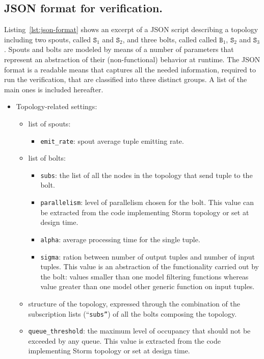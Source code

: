 {\color{blue}
\subsection{JSON format for verification.}
Listing~\ref{lst:json-format} shows an excerpt of a JSON script describing a topology including two spouts, called $\mathtt{S}_1$ and $\mathtt{S}_2$, and three bolts, called called $\mathtt{B}_1$, $\mathtt{S}_2$ and $\mathtt{S}_3$.
Spouts and bolts are modeled by means of a number of parameters that represent an abstraction of their (non-functional) behavior at runtime.
The JSON format is a readable means that captures all the needed information,  required to run the verification, that are classified into three distinct groups.
A list of the main ones is included hereafter.
\begin{itemize}
	\item Topology-related settings:
	\begin{itemize}
		\item list of spouts:
		\begin{itemize}
			\item \texttt{emit\_rate}: spout average tuple emitting rate.
		\end{itemize}
		\item list of bolts:
		\begin{itemize}
			\item \texttt{subs}: the list of all the nodes in the topology that send tuple to the bolt.
			\item \texttt{parallelism}: level of parallelism chosen for the bolt. This value can be extracted from the code implementing Storm topology or set at design time.
			\item \texttt{alpha}: average processing time for the single tuple.
			\item \texttt{sigma}: ration between number of output tuples and number of input tuples. This value is an abstraction of the functionality carried out by the bolt: values smaller than one model filtering functions whereas value greater than one model other generic function on input tuples.
		\end{itemize}
		\item structure of the topology, expressed through the combination of the subscription lists (``\texttt{subs''}) of all the bolts composing the topology.
		\item \texttt{queue\_threshold}: the maximum level of occupancy that should not be exceeded by any queue. This value is extracted from the code implementing Storm topology or set at design time.

\end{itemize}
\end{itemize}}
